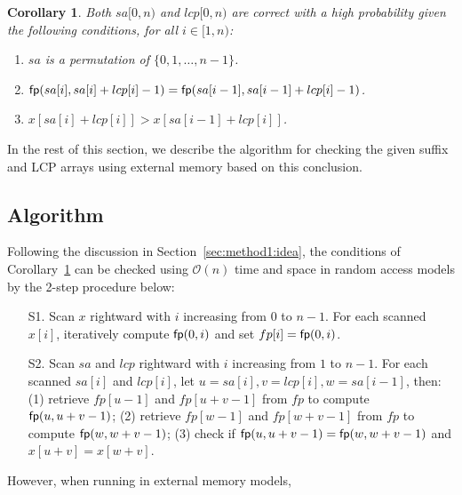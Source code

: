 \documentclass[10pt,journal,compsoc]{IEEEtran}
\newtheorem{Corollary}{Corollary}
\begin{document}
\begin{Corollary} \label{corollary:1}
	Both $sa[0, n)$ and $lcp[0, n)$ are correct with a high probability given the following conditions, for all $i \in [1, n)$:
	
	\begin{enumerate}[(1)]
		\item
		$sa$ is a permutation of $\{0, 1, \dots, n - 1\}$.
		
		\item
		${\sf fp}(sa[i], sa[i] + lcp[i] - 1) = {\sf fp}(sa[i - 1], sa[i - 1] + lcp[i] - 1)$.
		
		\item
		$x[sa[i] + lcp[i]] > x[sa[i - 1] + lcp[i]]$.
	\end{enumerate}
\end{Corollary}

In the rest of this section, we describe the algorithm for checking the given suffix and LCP arrays using external memory based on this conclusion. 

\subsection{Algorithm} \label{sec:method1:algorithm}

Following the discussion in Section~\ref{sec:method1:idea}, the conditions of Corollary~\ref{corollary:1} can be checked using $\mathcal{O}(n)$ time and space in random access models by the 2-step procedure below:

\begin{itemize}
	\item [S1.]
	Scan $x$ rightward with $i$ increasing from $0$ to $n - 1$. For each scanned $x[i]$, iteratively compute ${\sf fp}(0, i)$ and set $fp[i] = {\sf fp}(0, i)$.
	
	\item [S2.]
	Scan $sa$ and $lcp$ rightward with $i$ increasing from $1$ to $n - 1$. For each scanned $sa[i]$ and $lcp[i]$, let $u = sa[i], v = lcp[i], w = sa[i - 1]$, then: (1) retrieve $fp[u - 1]$ and $fp[u + v - 1]$ from $fp$ to compute ${\sf fp}(u, u + v - 1)$; (2) retrieve $fp[w - 1]$ and $fp[w + v - 1]$ from $fp$ to compute ${\sf fp}(w, w + v - 1)$; (3) check if ${\sf fp}(u, u + v - 1) = {\sf fp}(w, w + v - 1)$ and $x[u + v] = x[w + v]$.

\end{itemize}

However, when running in external memory models, 
\end{document}
